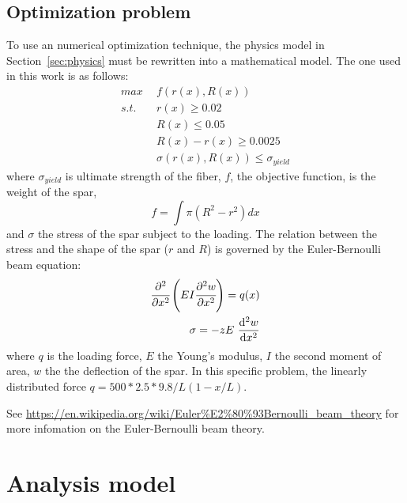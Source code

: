\documentclass[a4paper]{article}
\begin{document}
\subsection{Optimization problem}
To use an numerical optimization technique, the physics model in Section~\ref{sec:physics} must be rewritten into a mathematical model. The one used in this work is as follows:
\begin{equation} \label{eq:math_model_1}
\begin{aligned}
max\:\: &f(r(x), R(x)) \\
s.t.\:\: & r(x) \ge 0.02 \\
         & R(x) \le 0.05 \\
         & R(x)-r(x) \ge 0.0025 \\
         &\sigma(r(x), R(x)) \le \sigma_{yield}
\end{aligned}
\end{equation}
where $\sigma_{yield}$ is ultimate strength of the fiber, $f$, the objective function, is the weight of the spar, 
\begin{equation*}
f = \int \pi (R^2 - r^2) dx
\end{equation*}
and $\sigma$ the stress of the spar subject to the loading. The relation between the stress and the shape of the spar ($r$ and $R$) is governed by the Euler-Bernoulli beam equation:
\begin{equation}\label{pde}
\begin{aligned}
{\cfrac  {\partial ^{2}}{\partial x^{2}}}\left(EI{\cfrac  {\partial ^{2}w}{\partial x^{2}}}\right)=q(x)\\
\sigma =-zE~{\frac  {{\mathrm  {d}}^{2}w}{{\mathrm  {d}}x^{2}}}
\end{aligned}
\end{equation}
where $q$ is the loading force, $E$ the Young's modulus, $I$ the second moment of area, $w$ the the deflection of the spar. In this specific problem, the linearly distributed force $q=500*2.5*9.8/L (1-x/L)$.

See \url{https://en.wikipedia.org/wiki/Euler%E2%80%93Bernoulli_beam_theory} for more infomation on the Euler-Bernoulli beam theory.


\section{Analysis model} \label{sec:analysis_tool}
\end{document}
